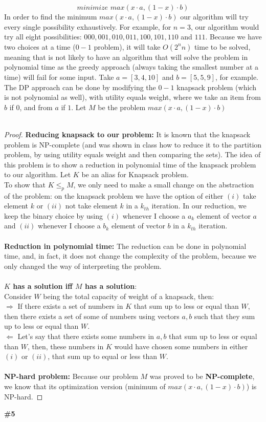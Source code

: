 \documentclass{article}
\begin{document}
$$
\textit{minimize } max(x \cdot a, (1-x) \cdot b)
$$
In order to find the minimum $max(x \cdot a, (1-x) \cdot b)$ our algorithm will try every single possibility exhaustively. For example, for $n = 3$, our algorithm would try all eight possibilities: $000, 001, 010, 011, 100, 101, 110$ and $111$. Because we have two choices at a time ($0-1$ problem), it will take $O(2^n n)$ time to be solved, meaning that is not likely to have an algorithm that will solve the problem in polynomial time as the greedy approach (always taking the smallest number at a time) will fail for some input. Take $a=[3, 4, 10]$ and $b=[5,5,9]$, for example. The DP approach can be done by modifying the $0-1$ knapsack problem (which is not polynomial as well), with utility equals weight, where we take an item from $b$ if $0$, and from $a$ if $1$. Let $M$ be the problem $max(x \cdot a, (1-x) \cdot b)$
\\
\\
\begin{proof}
\textbf{Reducing knapsack to our problem:} It is known that the knapsack problem is NP-complete (and was shown in class how to reduce it to the partition problem, by using utility equals weight and then comparing the sets). The idea of this problem is to show a reduction in polynomial time of the knapsack problem to our algorithm. Let $K$ be an alias for Knapsack problem. 
\\
To show that $K \leq_{p} M$, we only need to make a small change on the abstraction of the problem: on the knapsack problem we have the option of either $(i)$ take element $k$ or $(ii)$ not take element $k$ in a $k_{th}$ iteration. In our reduction, we keep the binary choice by using $(i)$ whenever I choose a $a_k$ element of vector $a$ and $(ii)$ whenever I choose a $b_k$ element of vector $b$ in a $k_{th}$ iteration.
\\
\\
\textbf{Reduction in polynomial time:} The reduction can be done in polynomial time, and, in fact, it does not change the complexity of the problem, because we only changed the way of interpreting the problem.
\\
\\
\textbf{$K$ has a solution iff $M$ has a solution}:
\\
Consider $W$ being the total capacity of weight of a knapsack, then:
\\
$\Longrightarrow $ If there exists a set of numbers in $K$ that sum up to less or equal than $W$, then there exists a set of some of numbers using vectors $a, b$ such that they sum up to less or equal than $W$.
\\
$\Longleftarrow $ Let’s say that there exists some numbers in $a, b$ that sum up to less or equal than $W$, then, these numbers in $K$ would have chosen some numbers in either $(i)$ or $(ii)$, that sum up to equal or less than $W$.
\\
\\
\textbf{NP-hard problem:} Because our problem $M$ was proved to be \textbf{NP-complete}, we know that its optimization version (minimum of $max(x \cdot a, (1-x) \cdot b)$) is NP-hard.
\end{proof}
\textbf{\#5}
\\
\end{document}
